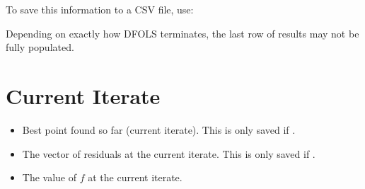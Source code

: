 \documentclass[letterpaper,10pt,english]{sphinxmanual}
\begin{document}
\sphinxAtStartPar
To save this information to a CSV file, use:
\begin{quote}

\begin{sphinxVerbatim}[commandchars=\\\{\}]

   

    

\end{sphinxVerbatim}
\end{quote}

\sphinxAtStartPar
Depending on exactly how DFO\sphinxhyphen{}LS terminates, the last row of results may not be fully populated.


\section{Current Iterate}
\label{\detokenize{diagnostic:current-iterate}}\begin{itemize}
\item {} 
\sphinxAtStartPar
{} \sphinxhyphen{} Best point found so far (current iterate). This is only saved if .

\item {} 
\sphinxAtStartPar
{} \sphinxhyphen{} The vector of residuals at the current iterate. This is only saved if .

\item {} 
\sphinxAtStartPar
{} \sphinxhyphen{} The value of \(f\) at the current iterate.

\end{itemize}
\end{document}

